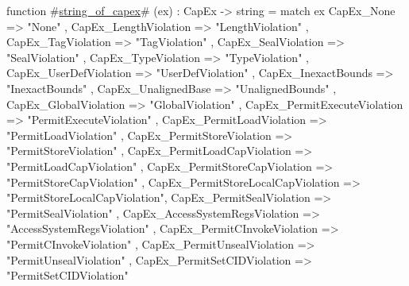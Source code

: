 function #\hyperref[sailRISCVzstringzyofzycapex]{string\_of\_capex}# (ex) : CapEx -> string =
  match ex {
    CapEx_None                          => "None"                        ,
    CapEx_LengthViolation               => "LengthViolation"             ,
    CapEx_TagViolation                  => "TagViolation"                ,
    CapEx_SealViolation                 => "SealViolation"               ,
    CapEx_TypeViolation                 => "TypeViolation"               ,
    CapEx_UserDefViolation              => "UserDefViolation"            ,
    CapEx_InexactBounds                 => "InexactBounds"               ,
    CapEx_UnalignedBase                 => "UnalignedBounds"             ,
    CapEx_GlobalViolation               => "GlobalViolation"             ,
    CapEx_PermitExecuteViolation        => "PermitExecuteViolation"      ,
    CapEx_PermitLoadViolation           => "PermitLoadViolation"         ,
    CapEx_PermitStoreViolation          => "PermitStoreViolation"        ,
    CapEx_PermitLoadCapViolation        => "PermitLoadCapViolation"      ,
    CapEx_PermitStoreCapViolation       => "PermitStoreCapViolation"     ,
    CapEx_PermitStoreLocalCapViolation  => "PermitStoreLocalCapViolation",
    CapEx_PermitSealViolation           => "PermitSealViolation"         ,
    CapEx_AccessSystemRegsViolation     => "AccessSystemRegsViolation"   ,
    CapEx_PermitCInvokeViolation        => "PermitCInvokeViolation"      ,
    CapEx_PermitUnsealViolation         => "PermitUnsealViolation"       ,
    CapEx_PermitSetCIDViolation         => "PermitSetCIDViolation"
  }
